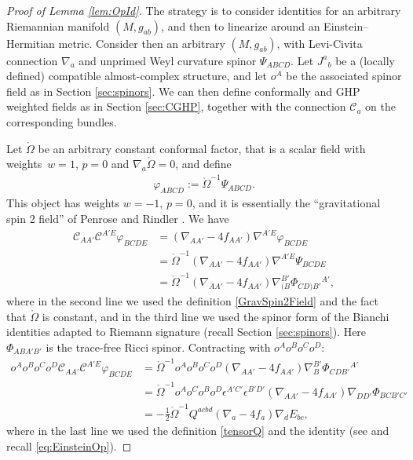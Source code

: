 \documentclass[pdftex]{sigma}
\numberwithin{equation}{section}
\begin{document}
\begin{proof}[Proof of Lemma \ref{lem:OpId}]
The strategy is to consider identities for an arbitrary Riemannian manifold $(M,g_{ab})$, and then to linearize around an Einstein--Hermitian metric. Consider then an arbitrary $(M,g_{ab})$, with Levi-Civita connection $\nabla_{a}$ and unprimed Weyl curvature spinor $\Psi_{ABCD}$. Let $J^{a}{}_{b}$ be a (locally defined) compatible almost-complex structure, and let $o^{A}$ be the associated spinor field as in Section \ref{sec:spinors}. We can then define conformally and GHP weighted fields as in Section \ref{sec:CGHP}, together with the connection $\mathcal{C}_{a}$ on the corresponding bundles.

Let $\mathring\Omega$ be an arbitrary constant conformal factor, that is a scalar field with weights~${w=1}$, ${p=0}$ and $\nabla_{a}\mathring\Omega=0$, and define
\begin{align}\label{GravSpin2Field}
 \varphi_{ABCD} := \mathring\Omega^{-1}\Psi_{ABCD}.
\end{align}
This object has weights $w=-1$, $p=0$, and it is essentially the ``gravitational spin 2 field'' of Penrose and Rindler \cite[equation~(9.6.40)]{PR:II}. We have
\begin{align*}
 \mathcal{C}_{AA'}\mathcal{C}^{A'E}\varphi_{BCDE} &=
(\nabla_{AA'}-4f_{AA'})\nabla^{A'E}\varphi_{BCDE} \\
 &= \mathring\Omega^{-1}(\nabla_{AA'}-4f_{AA'})\nabla^{A'E}\Psi_{BCDE} \\
 &= \mathring\Omega^{-1}(\nabla_{AA'}-4f_{AA'})\nabla_{(B}^{B'}\Phi_{CD)B'}{}^{A'},
\end{align*}
where in the second line we used the definition \eqref{GravSpin2Field} and the fact that $\mathring\Omega$ is constant, and in the third line we used the spinor form of the Bianchi identities \cite[equation~(4.10.7)]{PR:I}
adapted to Riemann signature (recall Section \ref{sec:spinors}).
Here $\Phi_{ABA'B'}$ is the trace-free Ricci spinor. Contracting with $o^Ao^Bo^Co^D$:
\begin{align}\label{AuxId}
\nonumber o^Ao^Bo^Co^D\mathcal{C}_{AA'}\mathcal{C}^{A'E}\varphi_{BCDE} &{} = \mathring\Omega^{-1}o^Ao^Bo^Co^D (\nabla_{AA'}-4f_{AA'})\nabla_{B}^{B'}\Phi_{CDB'}{}^{A'} \\
\nonumber &{} = \mathring\Omega^{-1}o^Ao^Co^Bo^D\epsilon^{A'C'}\epsilon^{B'D'} (\nabla_{AA'}-4f_{AA'})\nabla_{DD'}\Phi_{BCB'C'}\\
&{} = -\frac{1}{2}\mathring\Omega^{-1}Q^{acbd}(\nabla_{a}-4f_{a})\nabla_{d}E_{bc},
\end{align}
where in the last line we used the definition \eqref{tensorQ} and the identity  (see \cite[equa\-tion~(4.6.25)]{PR:I} and recall \eqref{eq:EinsteinOp}).


\end{proof}
\end{document}
